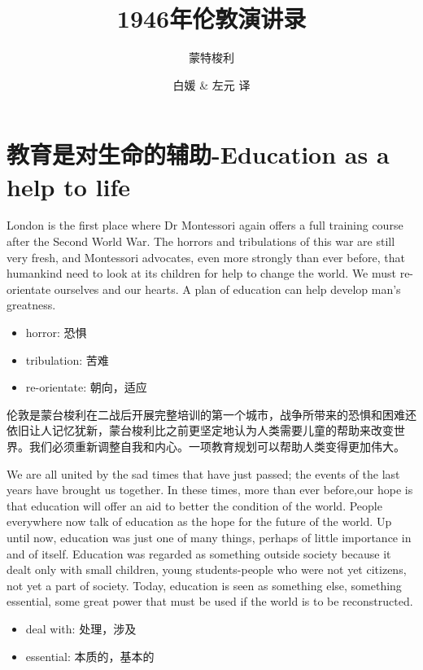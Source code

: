 \documentclass[lang=cn,10pt]{elegantbook}
\title{1946年伦敦演讲录}
\subtitle{蒙特梭利}
\author{白媛 \& 左元 译}
\begin{document}
\maketitle
\frontmatter

\tableofcontents

\mainmatter

\chapter{教育是对生命的辅助-Education as a help to life}

London is the first place where Dr Montessori again offers a full training course after the Second World War. The horrors and tribulations of this war are still very fresh, and Montessori advocates, even more strongly than ever before, that humankind need to look at its children for help to change the world. We must re-orientate ourselves and our hearts. A plan of education can help develop man's greatness.

\begin{tcolorbox}
    \begin{itemize}
        \item horror: 恐惧
        \item tribulation: 苦难
        \item re-orientate: 朝向，适应
    \end{itemize}
\end{tcolorbox}

伦敦是蒙台梭利在二战后开展完整培训的第一个城市，战争所带来的恐惧和困难还依旧让人记忆犹新，蒙台梭利比之前更坚定地认为人类需要儿童的帮助来改变世界。我们必须重新调整自我和内心。一项教育规划可以帮助人类变得更加伟大。

We are all united by the sad times that have just passed; the events of the last years have brought us together. In these times, more than ever before,our hope is that education will offer an aid to better the condition of the world. People everywhere now talk of education as the hope for the future of the world. Up until now, education was just one of many things, perhaps of little importance in and of itself. Education was regarded as something outside society because it dealt only with small children, young students-people who were not yet citizens, not yet a part of society. Today, education is seen as something else, something essential, some great power that must be used if the world is to be reconstructed.

\begin{tcolorbox}
    \begin{itemize}
        \item deal with: 处理，涉及
        \item essential: 本质的，基本的
    \end{itemize}
\end{tcolorbox}
\end{document}
